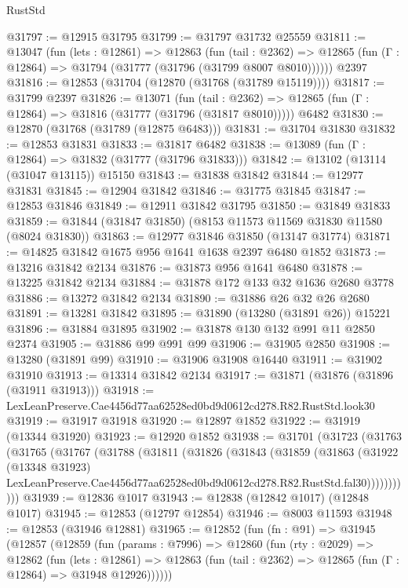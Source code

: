 \begin{lexlean}{RustStd}
\begin{coremodule}
@31797 := @12915 @31795
@31799 := @31797 @31732 @25559
@31811 := @13047
    (fun (lets : @12861) =>
    @12863
      (fun (tail : @2362) =>
      @12865 (fun (Γ : @12864) => @31794 (@31777 (@31796 (@31799 @8007 @8010))))))
    @2397
@31816 := @12853 (@31704 (@12870 (@31768 (@31789 @15119))))
@31817 := @31799 @2397
@31826 := @13071
    (fun (tail : @2362) => @12865 (fun (Γ : @12864) => @31816 (@31777 (@31796 (@31817 @8010)))))
    @6482
@31830 := @12870 (@31768 (@31789 (@12875 @6483)))
@31831 := @31704 @31830
@31832 := @12853 @31831
@31833 := @31817 @6482
@31838 := @13089 (fun (Γ : @12864) => @31832 (@31777 (@31796 @31833)))
@31842 := @13102 (@13114 (@31047 @13115)) @15150
@31843 := @31838 @31842
@31844 := @12977 @31831
@31845 := @12904 @31842
@31846 := @31775 @31845
@31847 := @12853 @31846
@31849 := @12911 @31842 @31795
@31850 := @31849 @31833
@31859 := @31844 (@31847 @31850) (@8153 @11573 @11569 @31830 @11580 (@8024 @31830))
@31863 := @12977 @31846 @31850 (@13147 @31774)
@31871 := @14825 @31842 @1675 @956 @1641 @1638 @2397 @6480 @1852
@31873 := @13216 @31842 @2134
@31876 := @31873 @956 @1641 @6480
@31878 := @13225 @31842 @2134
@31884 := @31878 @172 @133 @32 @1636 @2680 @3778
@31886 := @13272 @31842 @2134
@31890 := @31886 @26 @32 @26 @2680
@31891 := @13281 @31842
@31895 := @31890 (@13280 (@31891 @26)) @15221
@31896 := @31884 @31895
@31902 := @31878 @130 @132 @991 @11 @2850 @2374
@31905 := @31886 @99 @991 @99
@31906 := @31905 @2850
@31908 := @13280 (@31891 @99)
@31910 := @31906 @31908 @16440
@31911 := @31902 @31910
@31913 := @13314 @31842 @2134
@31917 := @31871 (@31876 (@31896 (@31911 @31913)))
@31918 := LexLeanPreserve.Cae4456d77aa62528ed0bd9d0612cd278.R82.RustStd.look30
@31919 := @31917 @31918
@31920 := @12897 @1852
@31922 := @31919 (@13344 @31920)
@31923 := @12920 @1852
@31938 := @31701
    (@31723
      (@31763
        (@31765
          (@31767
            (@31788
              (@31811
                (@31826
                  (@31843
                    (@31859
                      (@31863
                        (@31922
                          (@13348 @31923)
                          LexLeanPreserve.Cae4456d77aa62528ed0bd9d0612cd278.R82.RustStd.fal30)))))))))))
@31939 := @12836 @1017
@31943 := @12838 (@12842 @1017) (@12848 @1017)
@31945 := @12853 (@12797 @12854)
@31946 := @8003 @11593
@31948 := @12853 (@31946 @12881)
@31965 := @12852
    (fun (fn : @91) =>
    @31945
      (@12857
        (@12859
          (fun (params : @7996) =>
          @12860
            (fun (rty : @2029) =>
            @12862
              (fun (lets : @12861) =>
              @12863 (fun (tail : @2362) => @12865 (fun (Γ : @12864) => @31948 @12926))))))

\end{coremodule}
\end{lexlean}
